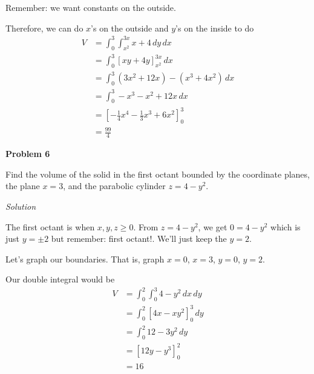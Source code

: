 \documentclass{article}
\newcommand{\lrb}[1]{\left[ #1 \right]}
\newcommand{\Solution}{\textit{Solution}}
\begin{document}
Remember: we want constants on the outside.

Therefore, we can do $x$'s on the outside and $y$'s on the inside to do
\begin{align*}
    V&=\int_0^3\int_{x^2}^{3x}x+4\,dy\,dx\\
    &=\int_0^3 \lrb{xy+4y}_{x^2}^{3x}\,dx\\
    &=\int_0^3 (3x^2+12x)-(x^3+4x^2)\,dx\\
    &=\int_0^3 -x^3-x^2+12x\,dx\\
    &=\lrb{-\frac{1}{4}x^4-\frac{1}{3}x^3+6x^2}_0^3\\
    &=\boxed{\frac{99}{4}}
\end{align*}

\textbf{Problem 6}

Find the volume of the solid in the first octant bounded by the coordinate planes, the plane $x=3$, and the parabolic cylinder $z=4-y^2$.

\Solution

The first octant is when $x,y,z\geq 0$. From $z=4-y^2$, we get $0=4-y^2$ which is just $y=\pm 2$ but remember: first octant!. We'll just keep the $y=2$.

Let's graph our boundaries. That is, graph $x=0$, $x=3$, $y=0$, $y=2$.
\begin{center}
\end{center}
Our double integral would be
\begin{align*}
    V&=\int_0^2\int_0^3 4-y^2\,dx\,dy\tag{easier to do $x$ then $y$}\\
    &=\int_0^2 \lrb{4x-xy^2}_0^3\,dy\\
    &=\int_0^2 12 -3y^2\,dy\\
    &=\lrb{12y-y^3}_0^2\\
    &=\boxed{16}
\end{align*}
\end{document}
